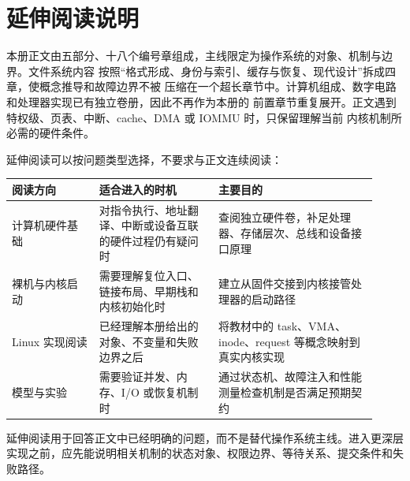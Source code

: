 \chapter*{延伸阅读说明}

本册正文由五部分、十八个编号章组成，主线限定为操作系统的对象、机制与边界。文件系统内容
按照“格式形成、身份与索引、缓存与恢复、现代设计”拆成四章，使概念推导和故障边界不被
压缩在一个超长章节中。计算机组成、数字电路和处理器实现已有独立卷册，因此不再作为本册的
前置章节重复展开。正文遇到特权级、页表、中断、cache、DMA 或 IOMMU 时，只保留理解当前
内核机制所必需的硬件条件。

延伸阅读可以按问题类型选择，不要求与正文连续阅读：

\begin{longtable}{|L{0.22\linewidth}|L{0.30\linewidth}|L{0.40\linewidth}|}
\toprule
阅读方向 & 适合进入的时机 & 主要目的 \\
\midrule
计算机硬件基础 & 对指令执行、地址翻译、中断或设备互联的硬件过程仍有疑问时 & 查阅独立硬件卷，补足处理器、存储层次、总线和设备接口原理 \\\tablerowrule
裸机与内核启动 & 需要理解复位入口、链接布局、早期栈和内核初始化时 & 建立从固件交接到内核接管处理器的启动路径 \\\tablerowrule
Linux 实现阅读 & 已经理解本册给出的对象、不变量和失败边界之后 & 将教材中的 task、VMA、inode、request 等概念映射到真实内核实现 \\\tablerowrule
模型与实验 & 需要验证并发、内存、I/O 或恢复机制时 & 通过状态机、故障注入和性能测量检查机制是否满足预期契约 \\
\bottomrule
\end{longtable}

\begin{keyidea}
延伸阅读用于回答正文中已经明确的问题，而不是替代操作系统主线。进入更深层实现之前，应先能说明相关机制的状态对象、权限边界、等待关系、提交条件和失败路径。
\end{keyidea}
